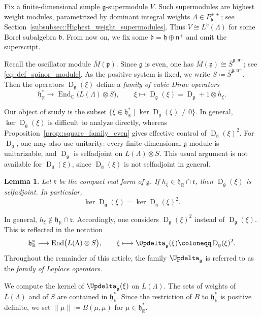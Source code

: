 \documentclass[11pt]{amsart}
\newcommand{\End}{\operatorname{End}}
\newcommand{\Dirac}{\operatorname{D}}
\def\Laplace{{\Updelta_{\gg}(\xi)}}
\def\rr{{\mathfrak{r}}}
\def\CC{{\mathbb C}}
\def\RR{{\mathbb R}}
\def\hh{{\mathfrak h}}
\def\pp{{\mathfrak p}}
\def\bb{{\mathfrak b}}
\def\pp{{\mathfrak p}}
\def\nn {{\mathfrak{n}}}
\def\pp{{\mathfrak{p}}}
\def\gg{{\mathfrak{g}}}
\theoremstyle{plain}
\newtheorem{lemma}[theorem]{Lemma}
\theoremstyle{remark}
\theoremstyle{definition}
\numberwithin{equation}{section}
\theoremstyle{remark}
\begin{document}
Fix a finite-dimensional simple $\gg$-supermodule $V$. Such supermodules are highest weight modules, parametrized by dominant integral weights $\Lambda\in P_{\bb}^{++}$; see Section~\ref{subsubsec::Highest_weight_supermodules}. Thus $V\cong L^{\bb}(\Lambda)$ for some Borel subalgebra $\bb$. From now on, we fix some $\bb=\hh\oplus\nn^{+}$ and omit the superscript.

Recall the oscillator module $\overline{M}(\pp)$. Since $\gg$ is even, one has $\overline{M}(\pp)\cong \overline{S}^{\gg,\nn^{-}}$; see \eqref{eq::def_spinor_module}. As the positive system is fixed, we write $S\coloneqq \overline{S}^{\gg,\nn^{-}}$. Then the operators
$\Dirac_{\gg}(\xi)$ define a \emph{family of cubic Dirac operators}
\begin{equation}
\hh^{\ast}_{\RR}\to \End_{\CC}\bigl(L(\Lambda)\otimes S\bigr),\qquad
\xi\mapsto \Dirac_{\gg}(\xi)=\Dirac_{\gg}+1\otimes h_{\xi}.
\end{equation}

Our object of study is the subset
$
\{\xi\in\hh_{\RR}^{\ast}\mid \ker \Dirac_{\gg}(\xi)\neq 0\}.
$
In general, $\ker \Dirac_{\gg}(\xi)$ is difficult to analyze directly, whereas Proposition~\ref{prop::square_family_even} gives effective control of $\Dirac_{\gg}(\xi)^{2}$. For $\Dirac_{\gg}$, one may also use unitarity: every finite-dimensional $\gg$-module is unitarizable, and $\Dirac_{\gg}$ is selfadjoint on $L(\Lambda)\otimes S$. This usual argument is not available for $\Dirac_{\gg}(\xi)$, since $\Dirac_{\gg}(\xi)$ is not selfadjoint in general.

\begin{lemma}
Let $\rr$ be the compact real form of $\gg$. If $h_{\xi}\in\hh_{\RR}\cap\rr$, then $\Dirac_{\gg}(\xi)$ is selfadjoint. In particular,
\[
\ker \Dirac_{\gg}(\xi)=\ker \Dirac_{\gg}(\xi)^{2}.
\]
\end{lemma}

In general, $h_{\xi}\notin\hh_{\RR}\cap\rr$. Accordingly, one considers $\Dirac_{\gg}(\xi)^{2}$ instead of $\Dirac_{\gg}(\xi)$. This is reflected in the notation
\begin{equation}
\hh_{\RR}^{\ast}\longrightarrow\End\bigl(L(\Lambda)\otimes S\bigr),
\qquad
\xi\longmapsto\Updelta_{\gg}(\xi)\coloneqq \Dirac_{\gg}(\xi)^{2}.
\end{equation}
Throughout the remainder of this article, the family $\Updelta_{\gg}$ is referred to as the \emph{family of Laplace operators}.


We compute the kernel of $\Laplace$ on $L(\Lambda)$. The sets of weights of $L(\Lambda)$ and of $S$ are contained in $\hh_{\RR}^{\ast}$. Since the restriction of $B$ to $\hh_{\RR}^{\ast}$ is positive definite, we set $\|\mu\|\coloneqq B(\mu,\mu)$ for $\mu\in\hh_{\RR}^{\ast}$. 
\end{document}
